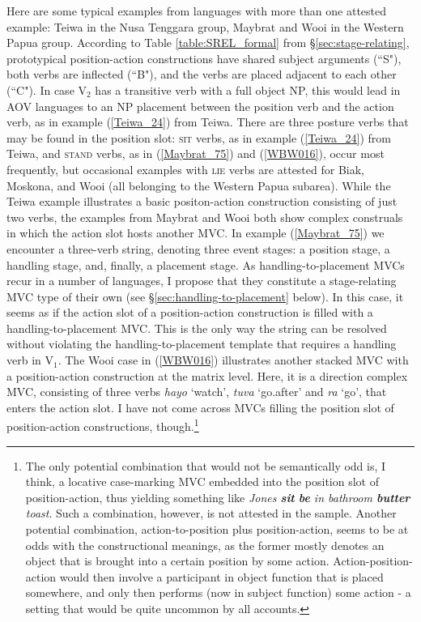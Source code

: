 Here are some typical examples from languages with more than one attested example: Teiwa in the Nusa Tenggara group, Maybrat and Wooi in the Western Papua group. According to Table \ref{table:SREL_formal} from §\ref{sec:stage-relating}, prototypical position-action constructions have shared subject arguments (``S"), both verbs are inflected (``B"), and the verbs are placed adjacent to each other (``C"). In case V$_2$ has a transitive verb with a full object NP, this would lead in AOV languages to an NP placement between the position verb and the action verb, as in example (\ref{Teiwa_24}) from Teiwa. There are three posture verbs that may be found in the position slot: \textsc{sit} verbs, as in example (\ref{Teiwa_24}) from Teiwa, and \textsc{stand} verbs, as in (\ref{Maybrat_75}) and (\ref{WBW016}), occur most frequently, but occasional examples with \textsc{lie} verbs are attested for Biak, Moskona, and Wooi (all belonging to the Western Papua subarea). While the Teiwa example illustrates a basic positon-action construction consisting of just two verbs, the examples from Maybrat and Wooi both show complex construals in which the action slot hosts another MVC. In example (\ref{Maybrat_75}) we encounter a three-verb string, denoting three event stages: a position stage, a handling stage, and, finally, a placement stage. As handling-to-placement MVCs recur in a number of languages, I propose that they constitute a stage-relating MVC type of their own (see §\ref{sec:handling-to-placement} below). In this case, it seems as if the action slot of a position-action construction is filled with a handling-to-placement MVC. This is the only way the string can be resolved without violating the handling-to-placement template that requires a handling verb in V$_1$. The Wooi case in (\ref{WBW016}) illustrates another stacked MVC with a position-action construction at the matrix level. Here, it is a direction complex MVC, consisting of three verbs \textit{hayo} `watch', \textit{tuva} `go.after' and \textit{ra} `go', that enters the action slot. I have not come across MVCs filling the position slot of position-action constructions, though.\footnote{The only potential combination that would not be semantically odd is, I think, a locative case-marking MVC embedded into the position slot of position-action, thus yielding something like \textit{Jones \textbf{sit} \textbf{be} in bathroom \textbf{butter} toast}. Such a combination, however, is not attested in the sample. Another potential combination, action-to-position plus position-action, seems to be at odds with the constructional meanings, as the former mostly denotes an object that is brought into a certain position by some action. Action-position-action would then involve a participant in object function that is placed somewhere, and only then performs (now in subject function) some action - a setting that would be quite uncommon by all accounts.}


